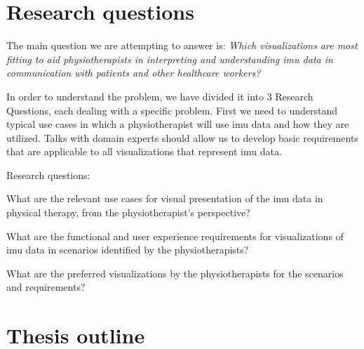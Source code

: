 \section{Research questions}
The main question we are attempting to answer is: \textit{Which visualizations are most fitting to aid physiotherapists in interpreting and understanding \gls{imu} data in communication with patients and other healthcare workers?}

In order to understand the problem, we have divided it into 3 Research Questions, each dealing with a specific problem. First we need to understand typical use cases in which a physiotherapist will use \gls{imu} data and how they are utilized. Talks with domain experts should allow us to develop basic requirements that are applicable to all visualizations that represent \gls{imu} data.

Research questions:
\vspace{-15pt}
\begin{description}[parsep=0pt, itemsep=0pt]
\item[Research Question 1:] What are the relevant use cases for visual presentation of the \gls{imu} data in physical therapy, from the physiotherapist's perspective?

\item[Research Question 2:] What are the functional and user experience requirements for visualizations of \gls{imu} data in scenarios identified by the physiotherapists?

\item[Research Question 3:] What are the preferred visualizations by the physiotherapists for the scenarios and requirements?
\end{description}

\section{Thesis outline}
